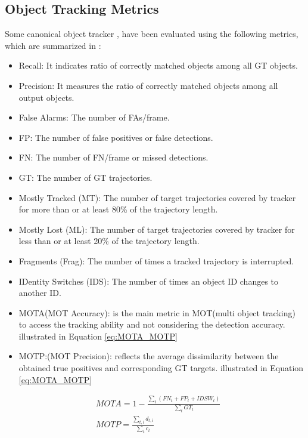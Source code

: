 \documentclass[10pt,twocolumn,letterpaper]{article}  %
\begin{document}
\subsection{Object Tracking Metrics}
Some canonical object tracker \cite{bewley2016simple}, \cite{wojke2017simple} have been evaluated using the following metrics, which are summarized in \cite{bisio2022systematic}:
\begin{itemize}
	\item Recall: It indicates ratio of correctly matched objects among all GT objects.
	\item Precision: It measures the ratio of correctly matched objects among all output objects.
	\item False Alarms: The number of FAs/frame.
	\item FP: The number of false positives or false detections.
	\item FN: The number of FN/frame or missed detections.
	\item GT: The number of GT trajectories.
	\item Mostly Tracked (MT): The number of target trajectories covered by tracker for more than or at least 80\% of the trajectory length.
	\item Mostly Lost (ML): The number of target trajectories covered by tracker for less than or at least 20\% of the trajectory length.
	\item Fragments (Frag): The number of times a tracked trajectory is interrupted.
	\item IDentity Switches (IDS): The number of times an object ID changes to another ID.
	\item MOTA(MOT Accuracy): is the main metric in MOT(multi object tracking) to access the tracking ability and not considering the detection accuracy. illustrated in Equation \ref{eq:MOTA_MOTP}
	\item MOTP:(MOT Precision): reflects the average dissimilarity between the obtained true positives and corresponding GT targets. illustrated in Equation \ref{eq:MOTA_MOTP}
	
\end{itemize}
\begin{equation}
	\label{eq:MOTA_MOTP}
	\begin{aligned}
		&MOTA = 1 - \frac{\sum_t(FN_t + FP_t + IDSW_t)}{\sum_t GT_t}\\
		&MOTP = \frac{\sum_{t,i} d_{t,i}}{\sum_t{c_t}} \\
	\end{aligned}
\end{equation}
\end{document}
